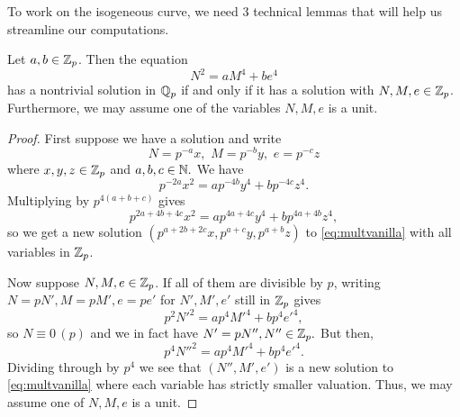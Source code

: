 \documentclass[12pt, a4paper]{amsart}
\begin{document}
To work on the isogeneous curve, we need 3 technical lemmas
that will help us streamline our computations.

\begin{lemma} \label{vanilla}
  Let $a, b \in {\mathbb Z}_p$. Then the equation 
  \begin{equation}
    \label{eq:multvanilla}
    N^2 = aM^4 + be^4
  \end{equation}
  has a nontrivial solution in ${\mathbb Q}_p$ if and only if it has a solution with
  $N, M, e \in {\mathbb Z}_p$. Furthermore, we may assume one of the variables $N, M, e$
  is a unit.
\end{lemma}

\begin{proof}
  First suppose we have a solution and write
  $$N = p^{-a}x, \,\, M = p^{-b}y, \,\, e = p^{-c}z$$ where $x,y,z \in {\mathbb Z}_p$ and
  $a,b,c \in {\mathbb N}.$ We have
  \[p^{-2a}x^2 = ap^{-4b}y^4 + bp^{-4c}z^4.\]
  Multiplying by $p^{4(a+b+c)}$ gives
  \[p^{2a+4b+4c}x^2 = ap^{4a+4c}y^4 + bp^{4a+4b}z^4,\]
  so we get a new solution $(p^{a+2b+2c}x, p^{a+c}y, p^{a+b}z)$ to
  \autoref{eq:multvanilla} with all variables in ${\mathbb Z}_p$.

  Now suppose $N, M, e \in {\mathbb Z}_p$. If all of them are divisible by $p$,
  writing $N = pN', M = pM', e = pe'$ for $N', M', e'$ still in ${\mathbb Z}_p$ gives
  \[p^2N'^2 = ap^4M'^4 + b p^4e'^4, \]
  so $N \equiv 0 \, (p)$ and we in fact have $N' = pN'', N'' \in {\mathbb Z}_p.$ 
  But then,
  \[p^4N''^2 = ap^4M'^4 + bp^4e'^4.\]
  Dividing through by $p^4$ we see that $(N'',M',e')$ is a new solution to
  \autoref{eq:multvanilla} where each variable has
  strictly smaller valuation. Thus, we may assume one of $N,M,e$ is a unit.
\end{proof}
\end{document}

